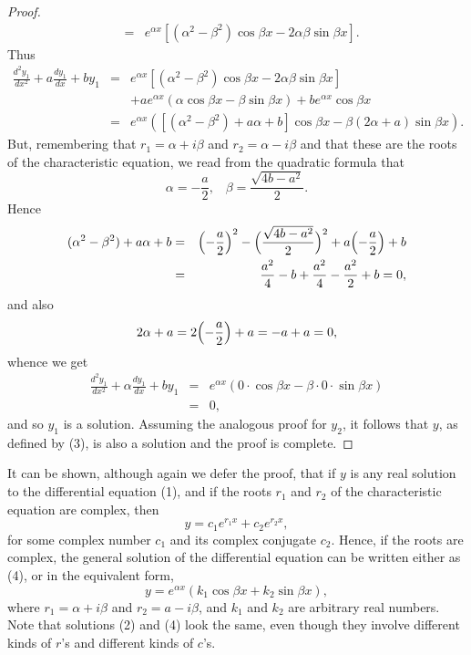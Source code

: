 \begin{proof}
\begin{eqnarray*}
&=& e^{\alpha x} [(\alpha^2  - \beta^2) \cos \beta x - 2\alpha\beta \sin \beta x].
\end{eqnarray*}
Thus
\begin{eqnarray*}
\frac{d^{2}y_1}{dx^2} + a \frac{dy_1}{dx} + by_1 
&=& e^{\alpha x}[(\alpha^2 - \beta^2) \cos \beta  x - 2\alpha \beta \sin \beta x] \\
& & + ae^{\alpha x}(\alpha \cos \beta x - \beta \sin \beta x) + be^{\alpha x} \cos \beta x \\
&=& e^{\alpha x}([(\alpha^2 - \beta^2) + a\alpha + b] \cos \beta x - \beta (2\alpha + a) \sin \beta x).
\end{eqnarray*}
But, remembering that $r_1 = \alpha + i \beta$ and $r_2 = \alpha - i \beta$ and that 
these are the roots of the characteristic equation, we read from the quadratic formula that
$$
\alpha = - \frac{a}{2}, \;\;\; \beta = \frac{\sqrt{4b - a^2}}{2}.
$$
Hence
\begin{eqnarray*}
(\alpha^2 - \beta^2) + a \alpha + b 
&=& \Bigl( -\frac{a}{2} \Bigr)^2 - \Bigl( \frac{\sqrt{4b - a^2}}{2} \Bigr)^2 + a \Bigl(- \frac{a}{2} \Bigr) + b\\
&=& \frac{a^2}{4} - b + \frac{a^2}{4} -\frac{a^2}{2} + b = 0, 
\end{eqnarray*}
and also 
$$
2 \alpha + a = 2 \Bigl(-\frac{a}{2} \Bigr) + a = -a + a = 0,
$$
whence we get
\begin{eqnarray*}
\frac{d^{2}y_1}{dx^2} + \alpha \frac {dy_1}{dx} + by_1 &=& e^{\alpha x} 
(0 \cdot \cos \beta x - \beta \cdot 0 \cdot  \sin \beta x) \\
&=& 0,
\end{eqnarray*}
and so $y_1$ is a solution. Assuming the analogous proof for $y_2$, it follows that $y$, 
as defined by (3), is also a solution and the proof is complete.
\end{proof}

It can be shown, although again we defer the proof, that if $y$ is any real solution to the
differential equation (1), and if the roots $r_1$ and $r_2$ of the characteristic equation are complex, then
\begin{equation}
y = c_{1}e^{r_{1}x} + c_{2}e^{r_{2}x} ,  
\label{eq6.8.4}
\end{equation}
for some complex number $c_1$ and its complex conjugate $c_2$. Hence, if the roots are complex, the general solution of the differential equation can be written either as (4), or in the equivalent form,
\begin{equation}
 y = e^{\alpha x}(k_{1} \cos \beta x + k_{2} \sin \beta x),  
\label{eq6.8.5}
\end{equation}
where $r_1 = \alpha + i\beta$ and $r_2 = a - i \beta$, and $k_1$ and $k_2$ are arbitrary real numbers. Note that solutions (2) and (4) look the same, even though they involve different kinds of $r$'s and different kinds of $c$'s.


